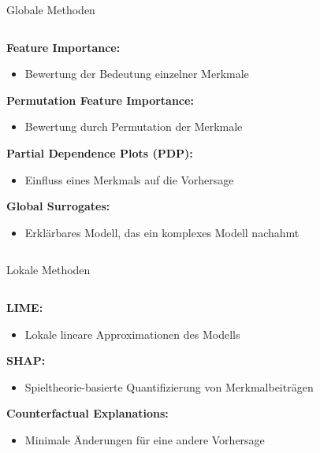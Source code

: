 \documentclass[aspectratio=1610, xcolor=dvipsnames, 9pt]{beamer}
\begin{document}
\begin{frame}{Globale Methoden}
  \begin{columns}
    \begin{column}{1\textwidth}
      \textbf{Feature Importance:}
      \begin{itemize}
        \item Bewertung der Bedeutung einzelner Merkmale
      \end{itemize}
      \vspace{0.3cm}
      \textbf{Permutation Feature Importance:}
      \begin{itemize}
        \item Bewertung durch Permutation der Merkmale
      \end{itemize}
      \vspace{0.3cm}
      \textbf{Partial Dependence Plots (PDP):}
      \begin{itemize}
        \item Einfluss eines Merkmals auf die Vorhersage
      \end{itemize}
      \vspace{0.3cm}
      \textbf{Global Surrogates:}
      \begin{itemize}
        \item Erklärbares Modell, das ein komplexes Modell nachahmt
      \end{itemize}
    \end{column}
  \end{columns}
\end{frame}

\begin{frame}{Lokale Methoden}
  \begin{columns}
    \begin{column}{1\textwidth}
      \textbf{LIME:}
      \begin{itemize}
        \item Lokale lineare Approximationen des Modells
      \end{itemize}
      \vspace{0.3cm}
      \textbf{SHAP:}
      \begin{itemize}
        \item Spieltheorie-basierte Quantifizierung von Merkmalbeiträgen
      \end{itemize}
      \vspace{0.3cm}
      \textbf{Counterfactual Explanations:}
      \begin{itemize}
        \item Minimale Änderungen für eine andere Vorhersage
      \end{itemize}
    \end{column}
  \end{columns}
\end{frame}
\end{document}
